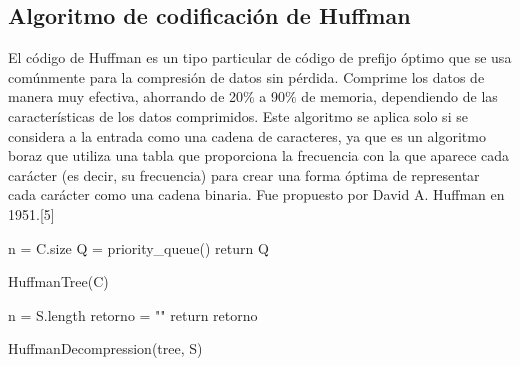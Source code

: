 \documentclass[spanish]{article}
\begin{document}
	\subsection{Algoritmo de codificación de Huffman}
		El código de Huffman es un tipo particular de código de prefijo óptimo que se usa comúnmente para la compresión de datos sin pérdida. Comprime los datos de manera muy efectiva, ahorrando de 20$\%$ a 90$\%$ de memoria, dependiendo de las características de los datos comprimidos. Este algoritmo se aplica solo si se considera a la entrada como una cadena de caracteres, ya que es un algoritmo boraz que utiliza una tabla que proporciona la frecuencia con la que aparece cada carácter (es decir, su frecuencia) para crear una forma óptima de representar cada carácter como una cadena binaria. Fue propuesto por David A. Huffman en 1951.[5]\\
		\begin{algorithm}[H]
			n = C.size\;
			Q = priority\_queue()\;
			return Q\;
			\caption{HuffmanTree(C)}
		\end{algorithm}
		\begin{algorithm}[H]
			n = S.length\;
			retorno = ""\;
			return retorno\;
			\caption{HuffmanDecompression(tree, S)}
		\end{algorithm}				
\end{document}
